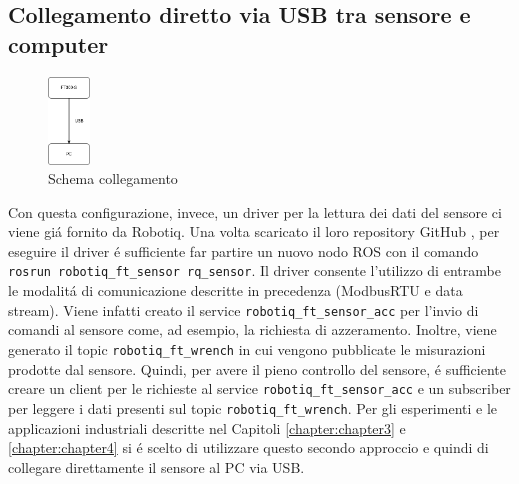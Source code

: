 \subsection{Collegamento diretto via USB tra sensore e computer}
\begin{figure}[H]
    \centering
    \includegraphics*[width=0.1\textwidth]{images/ft-pc.png}
    \caption{Schema collegamento}
    \label{fig:ft-pc}
\end{figure}
Con questa configurazione, invece, un driver per la lettura dei dati del sensore ci viene gi\'{a} fornito da Robotiq.
Una volta scaricato il loro repository GitHub \cite{robotiq_repo}, per eseguire il driver \'{e} sufficiente far partire 
un nuovo nodo ROS con il comando \verb|rosrun robotiq_ft_sensor rq_sensor|. 
Il driver consente l'utilizzo di entrambe le modalit\'{a} di comunicazione descritte in precedenza (ModbusRTU e data stream).
Viene infatti creato il service \verb|robotiq_ft_sensor_acc| per l'invio di comandi al sensore come, ad esempio, la richiesta 
di azzeramento. Inoltre, viene generato il topic \verb|robotiq_ft_wrench| in cui vengono pubblicate le misurazioni prodotte dal 
sensore. Quindi, per avere il pieno controllo del sensore, \'{e} sufficiente creare un client per le richieste al service 
\verb|robotiq_ft_sensor_acc| e un subscriber per leggere i dati presenti sul topic \verb|robotiq_ft_wrench|.
Per gli esperimenti e le applicazioni industriali descritte nel Capitoli \ref{chapter:chapter3} e \ref{chapter:chapter4} si \'{e} 
scelto di utilizzare questo secondo approccio e quindi di collegare direttamente il sensore al PC via USB.

